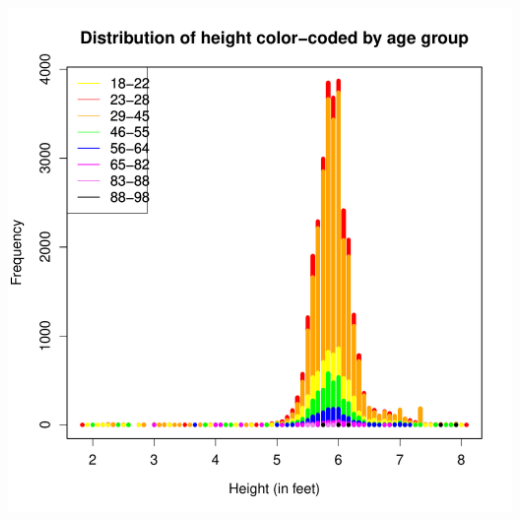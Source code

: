\documentclass[a4paper,12pt]{article}
\begin{document}
\includegraphics[scale=.80]{p3/height.pdf}
\section{}
\end{document}
